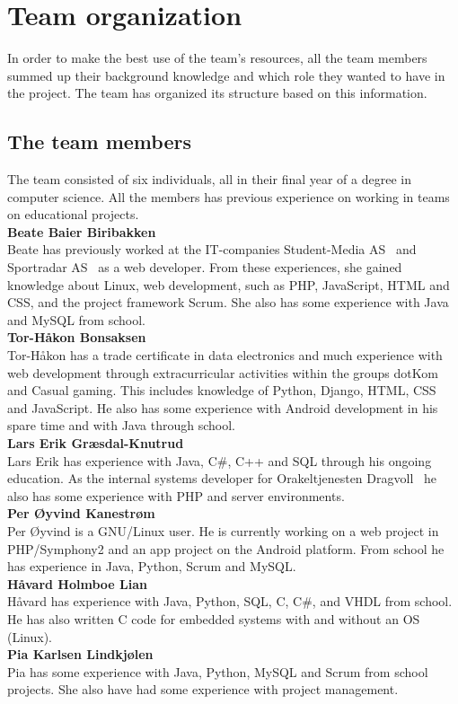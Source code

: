\newpage
\section{Team organization}
In order to make the best use of the team's resources, all the team members summed up their background knowledge and which role they wanted to have in the project. The team has organized its structure based on this information.

\subsection{The team members}
The team consisted of six individuals, all in their final year of a degree in computer science. All the members has previous experience on working in teams on educational projects.\\

\noindent\textbf{Beate Baier Biribakken}\\
Beate has previously worked at the IT-companies Student-Media AS~\cite{studentmedia} and Sportradar AS~\cite{sportradar} as a web developer. From these experiences, she gained knowledge about Linux, web development, such as PHP, JavaScript, HTML and CSS, and the project framework Scrum. She also has some experience with Java and MySQL from school.\\

\noindent\textbf{Tor-Håkon Bonsaksen}\\
Tor-Håkon has a trade certificate in data electronics and much experience with web development through extracurricular activities within the groups dotKom~\cite{dotkom} and Casual gaming\cite{casualgaming}. This includes knowledge of Python, Django, HTML, CSS and JavaScript. He also has some experience with Android development in his spare time and with Java through school.\\

\noindent\textbf{Lars Erik Græsdal-Knutrud}\\
Lars Erik has experience with Java, C\#, C++ and SQL through his ongoing education. As the internal systems developer for Orakeltjenesten Dragvoll~\cite{orakeltjenesten} he also has some experience with PHP and server environments. \\

\noindent\textbf{Per Øyvind Kanestrøm}\\
Per Øyvind is a GNU/Linux user. He is currently working on a web project in PHP/Symphony2 and an app project on the Android platform. From school he has experience in Java, Python, Scrum and MySQL.\\

\noindent\textbf{Håvard Holmboe Lian}\\
Håvard has experience with Java, Python, SQL, C, C\#, and VHDL from school. He has also written C code for embedded systems with and without an OS (Linux).\\ 

\noindent\textbf{Pia	Karlsen	Lindkjølen}\\
Pia has some experience with Java, Python, MySQL and Scrum from school projects. She also have had some experience with project management. 